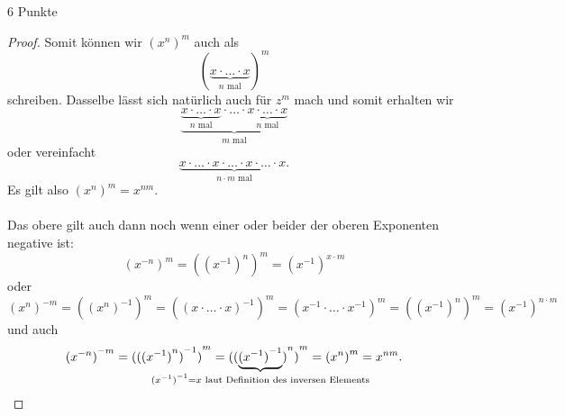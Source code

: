 \documentclass{problemset}
\begin{document}
\begin{problem}{6 Punkte}
\begin{proof}
    Somit können wir ${(x^n)}^m$ auch als \[
        (\underbrace{x \cdot \ldots \cdot x}_{n\text{ mal}})^m
    \] schreiben. Dasselbe lässt sich natürlich auch für $z^m$ mach und somit
       erhalten wir \[
        \underbrace{
        \underbrace{
            x \cdot \ldots \cdot x
        }_{n\text{ mal}
        } \cdot \ldots \cdot \underbrace{
            x \cdot \ldots \cdot x
        }_{n\text{ mal}}
        }_{m\text{ mal}}
    \] oder vereinfacht \[
        \underbrace{
            x \cdot \ldots \cdot x \cdot \ldots \cdot x \cdot \ldots \cdot x.
        }_{n \cdot m\text{ mal}}
    \]
    Es gilt also ${(x^n)}^m = x^{nm}$. \\ \\ Das obere gilt auch dann noch wenn
    einer oder beider der oberen Exponenten negative ist: \[
        {(x^{-n})}^m = {({(x^{-1})}^n)}^m = {(x^{-1})}^{x \cdot m}
    \] oder \[
        {(x^{n})}^{-m} = {({(x^n)}^{-1})}^m = {({(x \cdot \ldots \cdot x)}^{-1})}^m = {(x^{-1} \cdot \ldots \cdot x^{-1})}^m = {({(x^{-1})}^n)}^m = {(x^{-1})}^{n \cdot m}
    \] und auch \[
        {(x^{-n})}^{-m} = {({({(x^{-1})}^n)}^{-1})}^m = {({(\underbrace{{(x^{-1})}^{-1}}_{\mathclap{{(x^{-1})}^{-1} = x \text{ laut Definition des inversen Elements}}})}^n)}^m = {({x}^n)}^m = x^{nm}.
    \]
\end{proof}
\end{problem}
\end{document}
